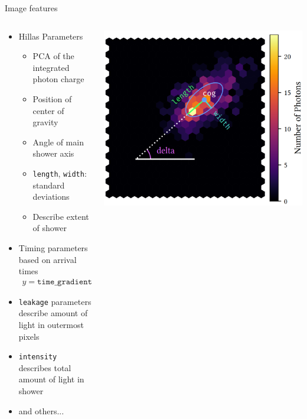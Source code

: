 \begin{frame}{Image features}
    \begin{columns}[onlytextwidth]
        \begin{column}{0.475\textwidth}
            \begin{itemize}
                \item Hillas Parameters
                    \begin{itemize}
                        \item PCA of the integrated photon charge
                        \item Position of center of gravity
                        \item Angle of main shower axis
                        \item \texttt{length}, \texttt{width}: standard deviations
                        \item[\textbf{\textcolor{tugreen}{\to}}] Describe extent of shower
                    \end{itemize}
                \item Timing parameters based on arrival times
                    \begin{align*}
                        y = \mathtt{time\_gradient} \cdot x + \mathtt{intercept}
                    \end{align*}
                \item \texttt{leakage} parameters describe amount of light in outermost pixels
                \item \texttt{intensity} describes total amount of light in shower
                \item and others...
            \end{itemize}
        \end{column}
        \begin{column}{0.475\textwidth}
            \centering
            \includegraphics[width=\textwidth]{images/hillas.png}\\[-0.5\baselineskip]

\end{column}
\end{columns}
\end{frame}
